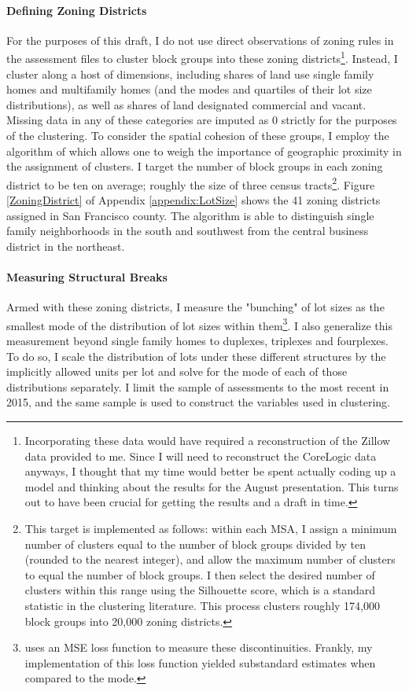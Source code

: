 \documentclass[]{article}
\begin{document}
\paragraph*{Defining Zoning Districts} For the purposes of this draft, I do not use direct observations of zoning rules in the assessment files to cluster block groups into these zoning districts\footnote{Incorporating these data would have required a reconstruction of the Zillow data provided to me. Since I will need to reconstruct the CoreLogic data anyways, I thought that my time would better be spent actually coding up a model and thinking about the results for the August presentation. This turns out to have been crucial for getting the results and a draft in time.}. Instead, I cluster along a host of dimensions, including shares of land use single family homes and multifamily homes (and the modes and quartiles of their lot size distributions), as well as shares of land designated commercial and vacant. Missing data in any of these categories are imputed as 0 strictly for the purposes of the clustering. To consider the spatial cohesion of these groups, I employ the algorithm of \cite{Chavent2018} which allows one to weigh the importance of geographic proximity in the assignment of clusters. I target the number of block groups in each zoning district to be ten on average; roughly the size of three census tracts\footnote{This target is implemented as follows: within each MSA, I assign a minimum number of clusters equal to the number of block groups divided by ten (rounded to the nearest integer), and allow the maximum number of clusters to equal the number of block groups. I then select the desired number of clusters within this range using the Silhouette score, which is a standard statistic in the clustering literature. This process clusters roughly 174,000 block groups into 20,000 zoning districts.}. Figure \ref{ZoningDistrict} of Appendix \ref{appendix:LotSize} shows the 41 zoning districts assigned in San Francisco county. The algorithm is able to distinguish single family neighborhoods in the south and southwest from the central business district in the northeast. 

\paragraph*{Measuring Structural Breaks} Armed with these zoning districts, I measure the "bunching" of lot sizes as the smallest mode of the distribution of lot sizes within them\footnote{\cite{Song} uses an MSE loss function to measure these discontinuities. Frankly, my implementation of this loss function yielded substandard estimates when compared to the mode.}. I also generalize this measurement beyond single family homes to duplexes, triplexes and fourplexes. To do so, I scale the distribution of lots under these different structures by the implicitly allowed units per lot and solve for the mode of each of those distributions separately. I limit the sample of assessments to the most recent in 2015, and the same sample is used to construct the variables used in clustering.
\end{document}
